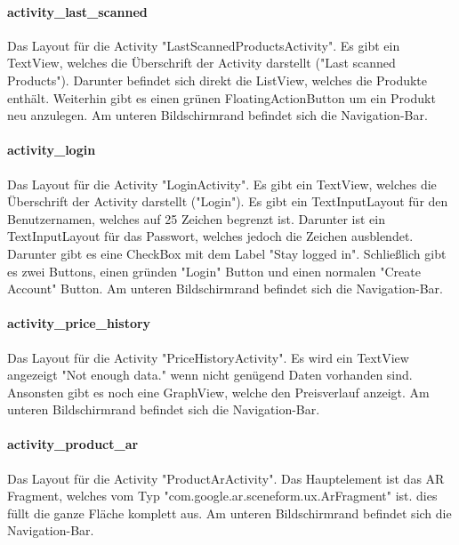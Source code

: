 \documentclass{scrartcl}
\begin{document}
\paragraph{activity\_last\_scanned} \mbox{} 

\noindent Das Layout für die Activity "LastScannedProductsActivity". Es gibt ein TextView, welches die Überschrift der Activity darstellt ("Last scanned Products"). Darunter befindet sich direkt die ListView, welches die Produkte enthält. Weiterhin gibt es einen grünen FloatingActionButton um ein Produkt neu anzulegen. Am unteren Bildschirmrand befindet sich die Navigation-Bar.

\paragraph{activity\_login} \mbox{} 

\noindent Das Layout für die Activity "LoginActivity". Es gibt ein TextView, welches die Überschrift der Activity darstellt ("Login"). Es gibt ein TextInputLayout für den Benutzernamen, welches auf 25 Zeichen begrenzt ist. Darunter ist ein TextInputLayout für das Passwort, welches jedoch die Zeichen ausblendet. Darunter gibt es eine CheckBox mit dem Label "Stay logged in". Schließlich gibt es zwei Buttons, einen gründen "Login" Button und einen normalen "Create Account" Button. Am unteren Bildschirmrand befindet sich die Navigation-Bar.

\paragraph{activity\_price\_history} \mbox{} 

\noindent Das Layout für die Activity "PriceHistoryActivity". Es wird ein TextView angezeigt "Not enough data." wenn nicht genügend Daten vorhanden sind. Ansonsten gibt es noch eine GraphView, welche den Preisverlauf anzeigt. Am unteren Bildschirmrand befindet sich die Navigation-Bar.

\paragraph{activity\_product\_ar} \mbox{} 

\noindent Das Layout für die Activity "ProductArActivity". Das Hauptelement ist das AR Fragment, welches vom Typ "com.google.ar.sceneform.ux.ArFragment" ist. dies füllt die ganze Fläche komplett aus. Am unteren Bildschirmrand befindet sich die Navigation-Bar.
\end{document}

